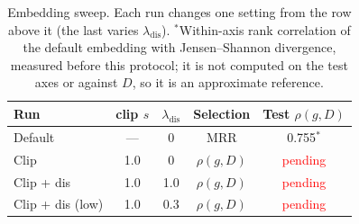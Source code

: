 \documentclass[11pt]{article}
\begin{document}
\begin{table}[t]
\centering
\small
\begin{tabular}{@{}lcccc@{}}
\toprule
Run & clip $s$ & $\lambda_{\mathrm{dis}}$ & Selection & Test $\rho(g, D)$ \\
\midrule
Default        & --- & 0   & MRR & 0.755$^\ast$ \\
Clip           & 1.0 & 0   & $\rho(g,D)$ & \textcolor{red}{pending} \\
Clip + dis     & 1.0 & 1.0 & $\rho(g,D)$ & \textcolor{red}{pending} \\
Clip + dis (low) & 1.0 & 0.3 & $\rho(g,D)$ & \textcolor{red}{pending} \\
\bottomrule
\end{tabular}
\caption{Embedding sweep. Each run changes one setting from the row above it
(the last varies $\lambda_{\mathrm{dis}}$). $^\ast$Within-axis rank correlation
of the default embedding with Jensen--Shannon divergence, measured before this
protocol; it is not computed on the test axes or against $D$, so it is an
approximate reference.}
\label{tab:sweep}
\end{table}
\end{document}
